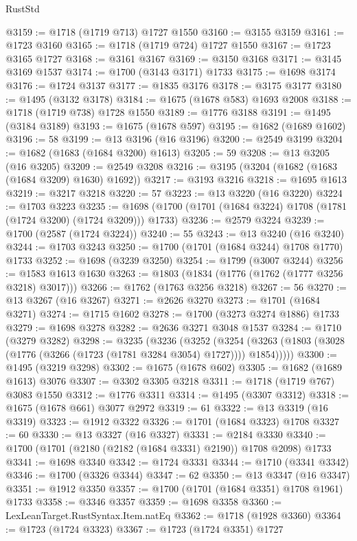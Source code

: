 \begin{lexlean}{RustStd}
\begin{coremodule}
@3159 := @1718 (@1719 @713) @1727 @1550
@3160 := @3155 @3159
@3161 := @1723 @3160
@3165 := @1718 (@1719 @724) @1727 @1550
@3167 := @1723 @3165 @1727
@3168 := @3161 @3167
@3169 := @3150 @3168
@3171 := @3145 @3169 @1537
@3174 := @1700 (@3143 @3171) @1733
@3175 := @1698 @3174
@3176 := @1724 @3137
@3177 := @1835 @3176
@3178 := @3175 @3177
@3180 := @1495 (@3132 @3178)
@3184 := @1675 (@1678 @583) @1693 @2008
@3188 := @1718 (@1719 @738) @1728 @1550
@3189 := @1776 @3188
@3191 := @1495 (@3184 @3189)
@3193 := @1675 (@1678 @597)
@3195 := @1682 (@1689 @1602)
@3196 := 58
@3199 := @13 @3196 (@16 @3196)
@3200 := @2549 @3199
@3204 := @1682 (@1683 (@1684 @3200) @1613)
@3205 := 59
@3208 := @13 @3205 (@16 @3205)
@3209 := @2549 @3208
@3216 := @3195 (@3204 (@1682 (@1683 (@1684 @3209) @1630) @1692))
@3217 := @3193 @3216
@3218 := @1695 @1613
@3219 := @3217 @3218
@3220 := 57
@3223 := @13 @3220 (@16 @3220)
@3224 := @1703 @3223
@3235 := @1698 (@1700 (@1701 (@1684 @3224) @1708 (@1781 (@1724 @3200) (@1724 @3209))) @1733)
@3236 := @2579 @3224
@3239 := @1700 (@2587 (@1724 @3224))
@3240 := 55
@3243 := @13 @3240 (@16 @3240)
@3244 := @1703 @3243
@3250 := @1700 (@1701 (@1684 @3244) @1708 @1770) @1733
@3252 := @1698 (@3239 @3250)
@3254 := @1799 (@3007 @3244)
@3256 := @1583 @1613 @1630
@3263 := @1803 (@1834 (@1776 (@1762 (@1777 @3256 @3218) @3017)))
@3266 := @1762 (@1763 @3256 @3218)
@3267 := 56
@3270 := @13 @3267 (@16 @3267)
@3271 := @2626 @3270
@3273 := @1701 (@1684 @3271)
@3274 := @1715 @1602
@3278 := @1700 (@3273 @3274 @1886) @1733
@3279 := @1698 @3278
@3282 := @2636 @3271 @3048 @1537
@3284 := @1710 (@3279 @3282)
@3298 := @3235
    (@3236
      (@3252
        (@3254 (@3263 (@1803 (@3028 (@1776 (@3266 (@1723 (@1781 @3284 @3054) @1727)))) @1854)))))
@3300 := @1495 (@3219 @3298)
@3302 := @1675 (@1678 @602)
@3305 := @1682 (@1689 @1613) @3076
@3307 := @3302 @3305 @3218
@3311 := @1718 (@1719 @767) @3083 @1550
@3312 := @1776 @3311
@3314 := @1495 (@3307 @3312)
@3318 := @1675 (@1678 @661) @3077 @2972
@3319 := 61
@3322 := @13 @3319 (@16 @3319)
@3323 := @1912 @3322
@3326 := @1701 (@1684 @3323) @1708
@3327 := 60
@3330 := @13 @3327 (@16 @3327)
@3331 := @2184 @3330
@3340 := @1700 (@1701 (@2180 (@2182 (@1684 @3331) @2190)) @1708 @2098) @1733
@3341 := @1698 @3340
@3342 := @1724 @3331
@3344 := @1710 (@3341 @3342)
@3346 := @1700 (@3326 @3344)
@3347 := 62
@3350 := @13 @3347 (@16 @3347)
@3351 := @1912 @3350
@3357 := @1700 (@1701 (@1684 @3351) @1708 @1961) @1733
@3358 := @3346 @3357
@3359 := @1698 @3358
@3360 := LexLeanTarget.RustSyntax.Item.natEq
@3362 := @1718 (@1928 @3360)
@3364 := @1723 (@1724 @3323)
@3367 := @1723 (@1724 @3351) @1727

\end{coremodule}
\end{lexlean}
